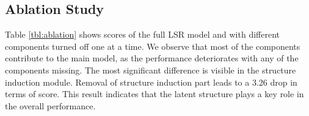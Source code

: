 \documentclass[11pt,a4paper]{article}
\begin{document}
\begin{table}[]
\small
{}
\vspace{-2mm}
\caption{\label{tbl:ablation} Ablation study of LSR on DocRED.}
\vspace{-5mm}
\end{table} \subsection{Ablation Study}
Table \ref{tbl:ablation} shows  scores of the full LSR model and with different components turned off one at a time.
We observe that most of the components contribute to the main model, as the performance deteriorates with any of the components missing. The most significant difference is visible in the structure induction module. Removal of structure induction part leads to a 3.26 drop in terms of  score. This result indicates that the latent structure plays a key role in the overall performance.  
\end{document}
